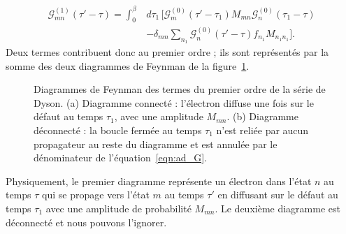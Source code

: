 \begin{equation}
\begin{aligned}
\mathcal{G}_{mn}^{(1)}(\tau'-\tau)
= \int_0^\beta &d\tau_1\,
\Big[
    \mathcal{G}^{(0)}_m(\tau'-\tau_1)M_{mn}\mathcal{G}^{(0)}_{n}(\tau_1-\tau)
\\
&
    -\delta_{mn}\sum_{n_1}\mathcal{G}_{n}^{(0)}(\tau'-\tau)f_{n_1} M_{n_1n_1}
\Big].
\end{aligned}
\end{equation}
Deux termes contribuent donc au premier ordre ; ils sont représentés par la somme des deux diagrammes de Feynman de la figure~\ref{fig:dyson_ordre1}.
\begin{figure}[htbp]
    \centering
    
    \caption[Diagrammes de Feynman des termes du premier ordre de la série de Dyson.]{Diagrammes de Feynman des termes du premier ordre de la série de Dyson. (a) Diagramme connecté : l'électron diffuse une fois sur le défaut au temps $\tau_1$, avec une amplitude $M_{mn}$. (b) Diagramme déconnecté : la boucle fermée au temps $\tau_1$ n'est reliée par aucun propagateur au reste du diagramme et est annulée par le dénominateur de l'équation~\eqref{eqn:ad_G}.}
    \label{fig:dyson_ordre1}
\end{figure}
Physiquement, le premier diagramme représente un électron dans l'état $n$ au temps $\tau$ qui se propage vers l'état $m$ au temps $\tau'$ en diffusant sur le défaut au temps $\tau_1$ avec une amplitude de probabilité $M_{mn}$. Le deuxième diagramme est déconnecté et nous pouvons l'ignorer.

